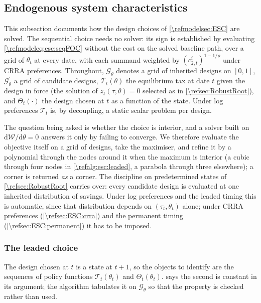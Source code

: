 \subsection{Endogenous system characteristics}\label{\refsec:ESC}
This subsection documents how the design choices of \cref{\refmodelsec:ESC} are solved. The sequential choice needs no solver: its sign is established by evaluating \eqref{\refmodeleq:esc:seqFOC} without the cost on the solved baseline path, over a grid of $\theta_t$ at every date, with each summand weighted by $(c_{2,t}^i)^{1-1/\rho}$ under CRRA preferences. Throughout, $\mathcal{G}_{\theta}$ denotes a grid of inherited designs on $[0,1]$, $\mathcal{G}_{\theta}^{\prime}$ a grid of candidate designs, $\mathcal{T}_t(\theta)$ the equilibrium tax at date $t$ given the design in force (the solution of $z_t(\tau,\theta)=0$ selected as in \cref{\refsec:RobustRoot}), and $\Theta_t(\cdot)$ the design chosen at $t$ as a function of the state. Under log preferences $\mathcal{T}_t$ is, by decoupling, a static scalar problem per design.

 The question being asked is whether the choice is interior, and a solver built on $\mathrm{d}\mathcal{W}/\mathrm{d}\theta = 0$ answers it only by failing to converge. We therefore evaluate the objective itself on a grid of designs, take the maximiser, and refine it by a polynomial through the nodes around it when the maximum is interior (a cubic through four nodes in \cref{\refalg:esc:leaded}, a parabola through three elsewhere); a corner is returned \emph{as} a corner. The discipline on predetermined states of \cref{\refsec:RobustRoot} carries over: every candidate design is evaluated at one inherited distribution of savings. Under log preferences and the leaded timing this is automatic, since that distribution depends on $(\tau_t,\theta_t)$ alone; under CRRA preferences (\cref{\refsec:ESC:crra}) and the permanent timing (\cref{\refsec:ESC:permanent}) it has to be imposed.


\subsubsection{The leaded choice}\label{\refsec:ESC:leaded}
The design chosen at $t$ is a state at $t+1$, so the objects to identify are the sequences of policy functions $\mathcal{T}_t(\theta_t)$ and $\Theta_t(\theta_t)$.  says the second is constant in its argument; the algorithm tabulates it on $\mathcal{G}_{\theta}$ so that the property is checked rather than used.

